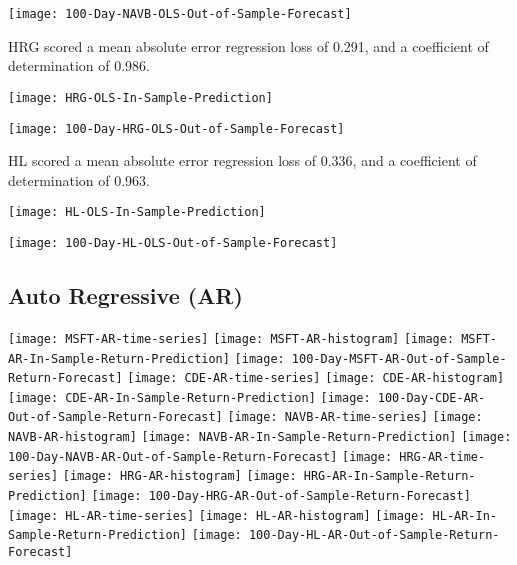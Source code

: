 \texttt{[image: 100-Day-NAVB-OLS-Out-of-Sample-Forecast]}

HRG scored a mean absolute error regression loss of 0.291, and a coefficient of determination of 0.986.

\texttt{[image: HRG-OLS-In-Sample-Prediction]}

\texttt{[image: 100-Day-HRG-OLS-Out-of-Sample-Forecast]}

HL scored a mean absolute error regression loss of 0.336, and a coefficient of determination of 0.963.

\texttt{[image: HL-OLS-In-Sample-Prediction]}

\texttt{[image: 100-Day-HL-OLS-Out-of-Sample-Forecast]}

\subsection{Auto Regressive (AR)}
\texttt{[image: MSFT-AR-time-series]}
\texttt{[image: MSFT-AR-histogram]}
\texttt{[image: MSFT-AR-In-Sample-Return-Prediction]}
\texttt{[image: 100-Day-MSFT-AR-Out-of-Sample-Return-Forecast]}
\texttt{[image: CDE-AR-time-series]}
\texttt{[image: CDE-AR-histogram]}
\texttt{[image: CDE-AR-In-Sample-Return-Prediction]}
\texttt{[image: 100-Day-CDE-AR-Out-of-Sample-Return-Forecast]}
\texttt{[image: NAVB-AR-time-series]}
\texttt{[image: NAVB-AR-histogram]}
\texttt{[image: NAVB-AR-In-Sample-Return-Prediction]}
\texttt{[image: 100-Day-NAVB-AR-Out-of-Sample-Return-Forecast]}
\texttt{[image: HRG-AR-time-series]}
\texttt{[image: HRG-AR-histogram]}
\texttt{[image: HRG-AR-In-Sample-Return-Prediction]}
\texttt{[image: 100-Day-HRG-AR-Out-of-Sample-Return-Forecast]}
\texttt{[image: HL-AR-time-series]}
\texttt{[image: HL-AR-histogram]}
\texttt{[image: HL-AR-In-Sample-Return-Prediction]}
\texttt{[image: 100-Day-HL-AR-Out-of-Sample-Return-Forecast]}

